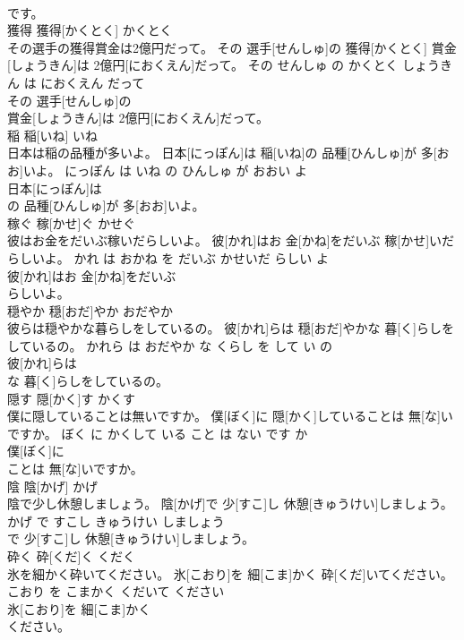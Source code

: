 \documentclass[8pt]{extreport}
\begin{document}
\begin{CJK}{UTF8}{min}
\\	です。			
\\	獲得	獲得[かくとく]	かくとく	
\\	その選手の獲得賞金は2億円だって。	その 選手[せんしゅ]の 獲得[かくとく] 賞金[しょうきん]は 2億円[におくえん]だって。	その せんしゅ の かくとく しょうきん は におくえん だって	
\\	その 選手[せんしゅ]の
\\	賞金[しょうきん]は 2億円[におくえん]だって。			
\\	稲	稲[いね]	いね	
\\	日本は稲の品種が多いよ。	日本[にっぽん]は 稲[いね]の 品種[ひんしゅ]が 多[おお]いよ。	にっぽん は いね の ひんしゅ が おおい よ	
\\	日本[にっぽん]は
\\	の 品種[ひんしゅ]が 多[おお]いよ。			
\\	稼ぐ	稼[かせ]ぐ	かせぐ	
\\	彼はお金をだいぶ稼いだらしいよ。	彼[かれ]はお 金[かね]をだいぶ 稼[かせ]いだらしいよ。	かれ は おかね を だいぶ かせいだ らしい よ	
\\	彼[かれ]はお 金[かね]をだいぶ
\\	らしいよ。			
\\	穏やか	穏[おだ]やか	おだやか	
\\	彼らは穏やかな暮らしをしているの。	彼[かれ]らは 穏[おだ]やかな 暮[く]らしをしているの。	かれら は おだやか な くらし を して い の	
\\	彼[かれ]らは
\\	な 暮[く]らしをしているの。			
\\	隠す	隠[かく]す	かくす	
\\	僕に隠していることは無いですか。	僕[ぼく]に 隠[かく]していることは 無[な]いですか。	ぼく に かくして いる こと は ない です か	
\\	僕[ぼく]に
\\	ことは 無[な]いですか。			
\\	陰	陰[かげ]	かげ	
\\	陰で少し休憩しましょう。	陰[かげ]で 少[すこ]し 休憩[きゅうけい]しましょう。	かげ で すこし きゅうけい しましょう	
\\	で 少[すこ]し 休憩[きゅうけい]しましょう。			
\\	砕く	砕[くだ]く	くだく	
\\	氷を細かく砕いてください。	氷[こおり]を 細[こま]かく 砕[くだ]いてください。	こおり を こまかく くだいて ください	
\\	氷[こおり]を 細[こま]かく
\\	ください。			

\end{CJK}
\end{document}
